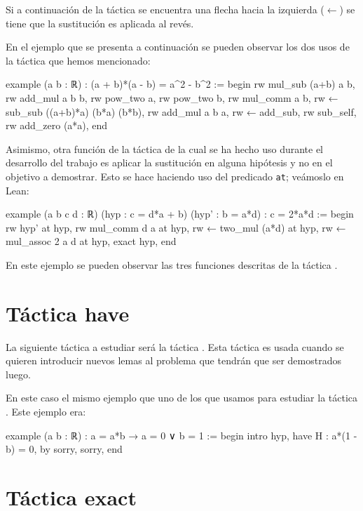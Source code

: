 Si a continuación de la táctica  se encuentra una
flecha hacia la izquierda (\(←\)) se tiene que la sustitución es aplicada
al revés.

En el ejemplo que se presenta a continuación se pueden observar los dos usos
de la táctica  que hemos mencionado:

\begin{leancode}
example (a b : ℝ) : (a + b)*(a - b) = a^2 - b^2 :=
begin
  rw mul_sub (a+b) a b,
  rw add_mul a b b,
  rw pow_two a,
  rw pow_two b,
  rw mul_comm a b,
  rw ← sub_sub ((a+b)*a) (b*a) (b*b),
  rw add_mul a b a,
  rw ← add_sub,
  rw sub_self,
  rw add_zero (a*a),
end
\end{leancode}

Asimismo, otra función de la táctica  de la cual se
ha hecho uso durante el desarrollo del trabajo es aplicar la sustitución en
alguna hipótesis y no en el objetivo a demostrar. Esto se hace haciendo uso
del predicado \texttt{at}; veámoslo en Lean:
\begin{leancode}
example (a b c d : ℝ) (hyp : c = d*a + b) (hyp' : b = a*d) : c = 2*a*d :=
begin
  rw hyp' at hyp,
  rw mul_comm d a at hyp,
  rw ← two_mul (a*d) at hyp,
  rw ← mul_assoc 2 a d at hyp,
  exact hyp,
end
\end{leancode}

En este ejemplo se pueden observar las tres funciones descritas de la táctica
.

\section{Táctica have}

La siguiente táctica a estudiar será la táctica
. Esta táctica es usada cuando se quieren introducir
nuevos lemas al problema que tendrán que ser demostrados luego.

En este caso el mismo ejemplo que uno de los que usamos para estudiar la táctica
. Este ejemplo era:

\begin{leancode}
example (a b : ℝ) : a = a*b → a = 0 ∨ b = 1 :=
begin
  intro hyp,
  have H : a*(1 - b) = 0, by sorry,
  sorry,
end
\end{leancode}

\section{Táctica exact}

